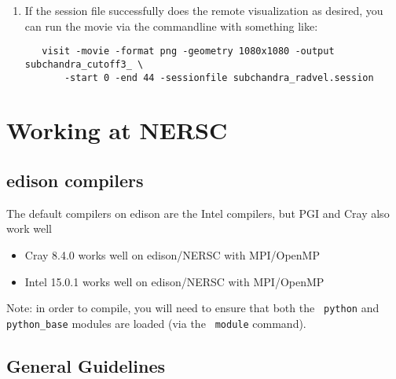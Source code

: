 \begin{itemize}
\begin{enumerate}
  \item If the session file successfully does the remote visualization
   as desired, you can run the movie via the commandline with something like:

   \begin{verbatim}
   visit -movie -format png -geometry 1080x1080 -output subchandra_cutoff3_ \
       -start 0 -end 44 -sessionfile subchandra_radvel.session
   \end{verbatim}

  \end{enumerate}

\end{itemize}


\section{Working at NERSC}

\subsection{edison compilers}

The default compilers on edison are the Intel compilers, but
PGI and Cray also work well

\begin{itemize}
\item Cray 8.4.0 works well on edison/NERSC with MPI/OpenMP

\item Intel 15.0.1 works well on edison/NERSC with MPI/OpenMP

\end{itemize}

Note: in order to compile, you will need to ensure that both the {\tt
python} and {\tt python\_base} modules are loaded (via the {\tt
module} command).

\subsection{General Guidelines}

